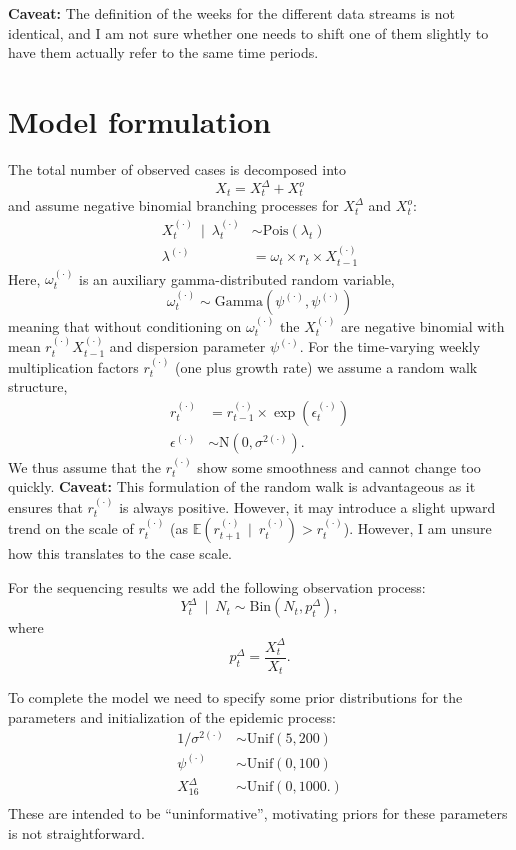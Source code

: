 \documentclass{article}
\begin{document}
\textbf{Caveat:} The definition of the weeks for the different data streams is not identical, and I am not sure whether one needs to shift one of them slightly to have them actually refer to the same time periods.

\section{Model formulation}

The total number of observed cases is decomposed into
$$
X_t = X^\Delta_t + X^o_t
$$
and assume negative binomial branching processes for $X^\Delta_t$ and $X^o_t$:
\begin{align*}
X^{(\cdot)}_t \ \mid \ \lambda^{(\cdot)}_t & \sim \text{Pois}(\lambda_t)\\
\lambda^{(\cdot)} & = \omega_t \times r_t \times X^{(\cdot)}_{t - 1}
\end{align*}
Here, $\omega^{(\cdot)}_t$ is an auxiliary gamma-distributed random variable,
$$
\omega^{(\cdot)}_t \sim \text{Gamma}(\psi^{(\cdot)}, \psi^{(\cdot)})
$$
meaning that without conditioning on $\omega^{(\cdot)}_t$ the $X^{(\cdot)}_t$ are negative binomial with mean $r^{(\cdot)}_t X^{(\cdot)}_{t - 1}$ and dispersion parameter $\psi^{(\cdot)}$. For the time-varying weekly multiplication factors $r^{(\cdot)}_t$ (one plus growth rate) we assume a random walk structure,
\begin{align*}
r^{(\cdot)}_t & = r^{(\cdot)}_{t - 1} \times \exp(\epsilon^{(\cdot)}_{t})\\
\epsilon^{(\cdot)} & \sim \text{N}(0, \sigma^{2(\cdot)}).
\end{align*}
We thus assume that the $r^{(\cdot)}_t$ show some smoothness and cannot change too quickly. \textbf{Caveat:} This formulation of the random walk is advantageous as it ensures that $r^{(\cdot)}_t$ is always positive. However, it may introduce a slight upward trend on the scale of $r^{(\cdot)}_{t}$ (as $\mathbb{E}(r^{(\cdot)}_{t + 1} \ \mid \ r^{(\cdot)}_{t}) > r^{(\cdot)}_{t}$). However, I am unsure how this translates to the case scale.

For the sequencing results we add the following observation process:
$$
Y^\Delta_t \ \mid \ N_t \sim \text{Bin}(N_t, p^\Delta_t),
$$
where
$$
p^\Delta_t = \frac{X^\Delta_t}{X_t}.
$$

To complete the model we need to specify some prior distributions for the parameters and initialization of the epidemic process:
\begin{align*}
1/\sigma^{2(\cdot)} & \sim \text{Unif}(5, 200)\\
\psi^{(\cdot)} & \sim \text{Unif}(0, 100)\\
X^\Delta_{16} & \sim \text{Unif}(0, 1000.)\\
\end{align*}
These are intended to be ``uninformative'', motivating priors for these parameters is not straightforward.
\end{document}
